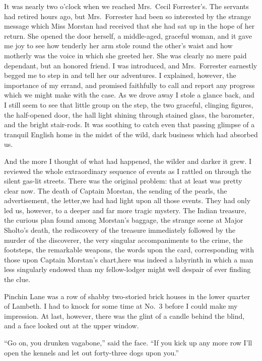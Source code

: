 \documentclass[12pt,english,oneside]{book}
\begin{document}
It was nearly two o'clock when we reached Mrs.\ Cecil Forrester's.
The servants had retired hours ago, but Mrs.\ Forrester had been
so interested by the strange message which Miss Morstan had received
that she had sat up in the hope of her return. She opened the door
herself, a middle-aged, graceful woman, and it gave me joy to see
how tenderly her arm stole round the other's waist and how motherly
was the voice in which she greeted her. She was clearly no mere paid
dependant, but an honored friend. I was introduced, and Mrs.\ Forrester
earnestly begged me to step in and tell her our adventures. I explained,
however, the importance of my errand, and promised faithfully to call
and report any progress which we might make with the case. As we drove
away I stole a glance back, and I still seem to see that little group
on the step, the two graceful, clinging figures, the half-opened door,
the hall light shining through stained glass, the barometer, and the
bright stair-rods. It was soothing to catch even that passing glimpse
of a tranquil English home in the midst of the wild, dark business
which had absorbed us.

And the more I thought of what had happened, the wilder and darker
it grew. I reviewed the whole extraordinary sequence of events as
I rattled on through the silent gas-lit streets. There was the original
problem: that at least was pretty clear now. The death of Captain
Morstan, the sending of the pearls, the advertisement, the letter,\mdsh{---}we
had had light upon all those events. They had only led us, however,
to a deeper and far more tragic mystery. The Indian treasure, the
curious plan found among Morstan's baggage, the strange scene at Major
Sholto's death, the rediscovery of the treasure immediately followed
by the murder of the discoverer, the very singular accompaniments
to the crime, the footsteps, the remarkable weapons, the words upon
the card, corresponding with those upon Captain Morstan's chart,\mdsh{---}here
was indeed a labyrinth in which a man less singularly endowed than
my fellow-lodger might well despair of ever finding the clue.

Pinchin Lane was a row of shabby two-storied brick houses in the lower
quarter of Lambeth. I had to knock for some time at No.\ 3 before
I could make my impression. At last, however, there was the glint
of a candle behind the blind, and a face looked out at the upper window.

{}``Go on, you drunken vagabone,'' said the face. {}``If you kick
up any more row I'll open the kennels and let out forty-three dogs
upon you.''
\end{document}
